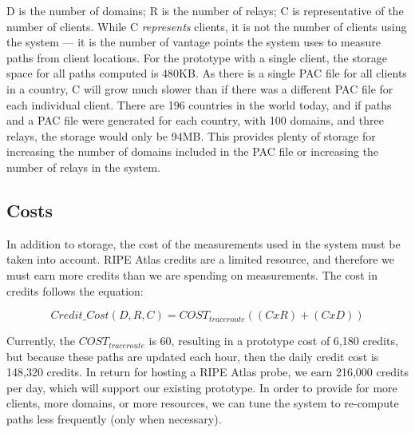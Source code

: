 D is the number of domains; R is the number of relays; C is representative of the number of 
clients.  While C {\it represents} clients, it is not the number of clients using the 
system --- it is the number of vantage points the system uses to measure paths 
from client locations.  For the prototype with a single client, the storage space for all 
paths computed is 480KB.  As there is a single PAC file for all clients in 
a country, C will grow much slower than if there was a different PAC file for 
each individual client.  There are 196 countries in the world today, and if 
paths and a PAC file were generated for each country, with 100 domains, and 
three relays, the storage would only be 94MB.  This provides plenty of storage 
for increasing the number of domains included in the PAC file or increasing 
the number of relays in the system.

\subsection{Costs}
In addition to storage, the cost of the measurements used in the system must 
be taken into account.  RIPE Atlas credits are a limited resource, and therefore 
we must earn more credits than we are spending on measurements.  The cost 
in credits follows the equation:

\[Credit\_Cost(D,R,C) = COST_{traceroute}((C x R) + (C x D))\]

Currently, the $COST_{traceroute}$ is 60, resulting in a prototype cost of 6,180 
credits, but because these paths are updated each hour, then 
the daily credit cost is 148,320 credits.  In return for hosting a RIPE Atlas 
probe, we earn 216,000 credits per day, which will support our existing 
prototype.  In order to provide for more clients, more domains, or more 
resources, we can tune the system to re-compute paths less frequently (only when necessary).
